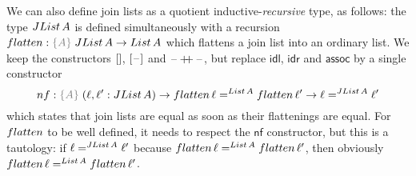 \documentclass[a4paper,UKenglish,numberwithinsect,cleveref,thm-restate]{lipics-v2021}
\begin{document}
We can also define join lists as a quotient inductive-\emph{recursive} type, as follows: the type $\JList{A}$ is defined simultaneously with a recursion $\flatten : \implicit{A}\;\JList{A} \to \List{A}$ which flattens a join list into an ordinary list. We keep the constructors $\Jnil$, $\Jsing{\blank}$ and $\mathord{\hspace{1pt}\text{--}\hspace{1pt}} \mathop{+\!\!+} \mathord{\hspace{1pt}\text{--}\hspace{1pt}}$, but replace $\mathsf{idl}$, $\mathsf{idr}$ and $\mathsf{assoc}$ by a single constructor
\[
  \mathsf{nf} : \implicit{A}\;(\ell, \ell' : \JList{A}) \to \flatten\,\ell =^{\mathsf{List}\,A} \flatten\,\ell' \to \ell =^{\JList{A}} \ell'
\]
which states that join lists are equal as soon as their flattenings are equal. For $\flatten$ to be well defined, it needs to respect the $\mathsf{nf}$ constructor, but this is a tautology: if $\ell =^{\JList{A}} \ell'$ because $\flatten\,\ell =^{\mathsf{List}\,A} \flatten\,\ell'$, then obviously $\flatten\,\ell =^{\mathsf{List}\,A} \flatten\,\ell'$.

\end{document}
